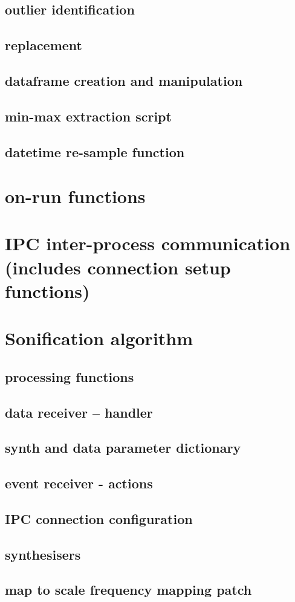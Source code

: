 \documentclass[11pt]{article}
\begin{document}
\subsection{outlier identification}
\label{sec:orga32c40a}
\subsection{replacement}
\label{sec:org7f1f43f}
\subsection{dataframe creation and manipulation}
\label{sec:orgad4ee46}
\subsection{min-max extraction script}
\label{sec:orga3349c2}
\subsection{datetime re-sample function}
\label{sec:org1adad15}
\section{on-run functions}
\label{sec:orgb5526f4}
\section{IPC inter-process communication (includes connection setup functions)}
\label{sec:orgfe3fee3}
\section{Sonification algorithm}
\label{sec:org80b7ab9}
\subsection{processing functions}
\label{sec:org6c644b6}
\subsection{data receiver -- handler}
\label{sec:org0d991e2}
\subsection{synth and data parameter dictionary}
\label{sec:org5c8a463}
\subsection{event receiver - actions}
\label{sec:org5207646}
\subsection{IPC connection configuration}
\label{sec:org0657bc8}
\subsection{synthesisers}
\label{sec:org0f9dc78}
\subsection{map to scale frequency mapping patch}
\label{sec:orgb11469d}
\end{document}
